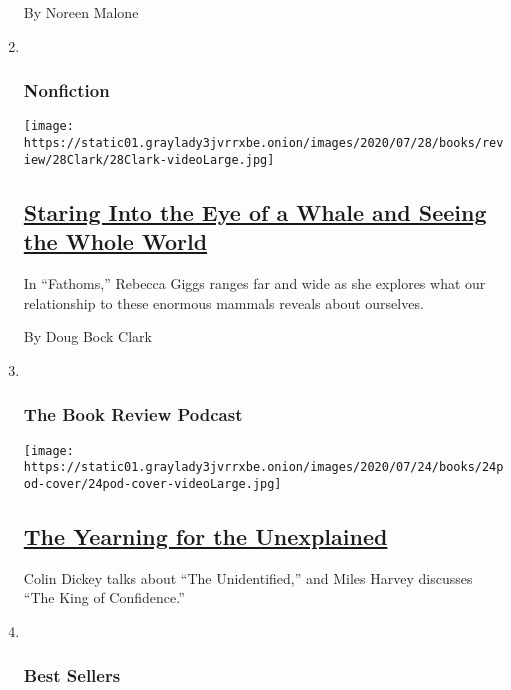 \begin{enumerate}
  By Noreen Malone
\item ~
  \hypertarget{nonfiction-1}{%
  \subsubsection{Nonfiction}\label{nonfiction-1}}

  \texttt{[image: https://static01.graylady3jvrrxbe.onion/images/2020/07/28/books/review/28Clark/28Clark-videoLarge.jpg]}

  \hypertarget{staring-into-the-eye-of-a-whale-and-seeing-the-whole-world}{%
  \subsection{\texorpdfstring{\href{/2020/07/28/books/review/fathoms-whale-rebecca-giggs.html}{Staring
  Into the Eye of a Whale and Seeing the Whole
  World}}{Staring Into the Eye of a Whale and Seeing the Whole World}}\label{staring-into-the-eye-of-a-whale-and-seeing-the-whole-world}}

  In ``Fathoms,'' Rebecca Giggs ranges far and wide as she explores what
  our relationship to these enormous mammals reveals about ourselves.

  By Doug Bock Clark
\item ~
  \hypertarget{the-book-review-podcast}{%
  \subsubsection{The Book Review
  Podcast}\label{the-book-review-podcast}}

  \texttt{[image: https://static01.graylady3jvrrxbe.onion/images/2020/07/24/books/24pod-cover/24pod-cover-videoLarge.jpg]}

  \hypertarget{the-yearning-for-the-unexplained}{%
  \subsection{\texorpdfstring{\href{/2020/07/24/books/review/podcast-colin-dickey-unexplained-miles-harvey-king-of-confidence.html}{The
  Yearning for the
  Unexplained}}{The Yearning for the Unexplained}}\label{the-yearning-for-the-unexplained}}

  Colin Dickey talks about ``The Unidentified,'' and Miles Harvey
  discusses ``The King of Confidence.''
\item ~
  \hypertarget{best-sellers}{%
  \subsubsection{Best Sellers}\label{best-sellers}}


\end{enumerate}
